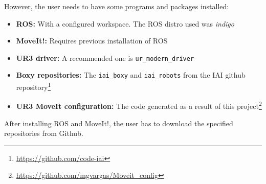 However, the user needs to have some programs and packages installed: 
\begin{itemize}
	\item \textbf{ROS:} With a configured workspace. The ROS distro used was \textit{indigo}
	\item \textbf{MoveIt!:} Requires previous installation of ROS
	\item \textbf{UR3 driver:} A recommended one is \texttt{ur\_modern\_driver}
	\item \textbf{Boxy repositories:} The \texttt{iai\_boxy} and \texttt{iai\_robots} from the IAI github repository\footnote{\url{https://github.com/code-iai}}
	\item \textbf{UR3 MoveIt configuration:} The code generated as a result of this project\footnote{\url{https://github.com/mgvargas/Moveit_config}}
\end{itemize}


After installing ROS and MoveIt!, the user has to download the specified repositories from Github. 

